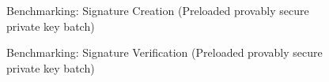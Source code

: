 \documentclass[]{final_report}
\begin{document}
\begin{figure}[H]
\begin{minipage}{0.49\textwidth}
       \caption{Benchmarking: Signature Creation (Preloaded provably secure private key batch)}
        \label{fig:pre2}
    \end{minipage}
      \begin{minipage}{0.55\textwidth}
        \centering
       \caption{Benchmarking: Signature Verification (Preloaded provably secure private key batch)}
        \label{fig:pre3}
    \end{minipage}
\end{figure}
\end{document}
